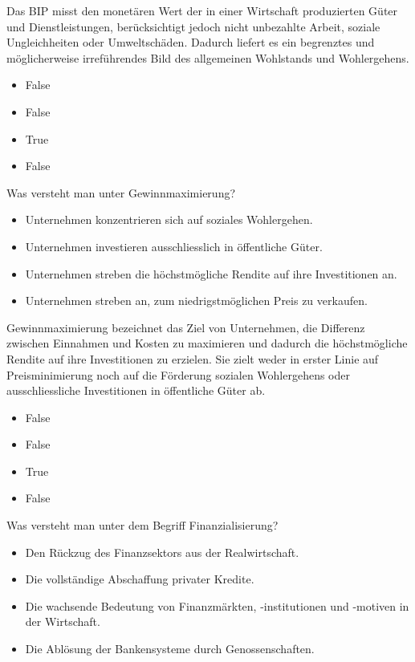 \documentclass[
  nswissgerman,
  a4paper,
  DIV=11,
  numbers=noendperiod,
  oneside,
  openany]{scrreprt}
\providecommand{\tightlist}{%
  \setlength{\itemsep}{0pt}\setlength{\parskip}{0pt}}
\begin{document}
Das BIP misst den monetären Wert der in einer Wirtschaft produzierten
Güter und Dienstleistungen, berücksichtigt jedoch nicht unbezahlte
Arbeit, soziale Ungleichheiten oder Umweltschäden. Dadurch liefert es
ein begrenztes und möglicherweise irreführendes Bild des allgemeinen
Wohlstands und Wohlergehens.

\begin{itemize}
\tightlist
\item
  False
\item
  False
\item
  True
\item
  False
\end{itemize}

Was versteht man unter Gewinnmaximierung?

\begin{itemize}
\tightlist
\item[$\square$]
  Unternehmen konzentrieren sich auf soziales Wohlergehen.
\item[$\square$]
  Unternehmen investieren ausschliesslich in öffentliche Güter.
\item[$\square$]
  Unternehmen streben die höchstmögliche Rendite auf ihre Investitionen
  an.
\item[$\square$]
  Unternehmen streben an, zum niedrigstmöglichen Preis zu verkaufen.
\end{itemize}

Gewinnmaximierung bezeichnet das Ziel von Unternehmen, die Differenz
zwischen Einnahmen und Kosten zu maximieren und dadurch die
höchstmögliche Rendite auf ihre Investitionen zu erzielen. Sie zielt
weder in erster Linie auf Preisminimierung noch auf die Förderung
sozialen Wohlergehens oder ausschliessliche Investitionen in öffentliche
Güter ab.

\begin{itemize}
\tightlist
\item
  False
\item
  False
\item
  True
\item
  False
\end{itemize}

Was versteht man unter dem Begriff Finanzialisierung?

\begin{itemize}
\tightlist
\item[$\square$]
  Den Rückzug des Finanzsektors aus der Realwirtschaft.
\item[$\square$]
  Die vollständige Abschaffung privater Kredite.
\item[$\square$]
  Die wachsende Bedeutung von Finanzmärkten, -institutionen und -motiven
  in der Wirtschaft.
\item[$\square$]
  Die Ablösung der Bankensysteme durch Genossenschaften.
\end{itemize}
\end{document}
